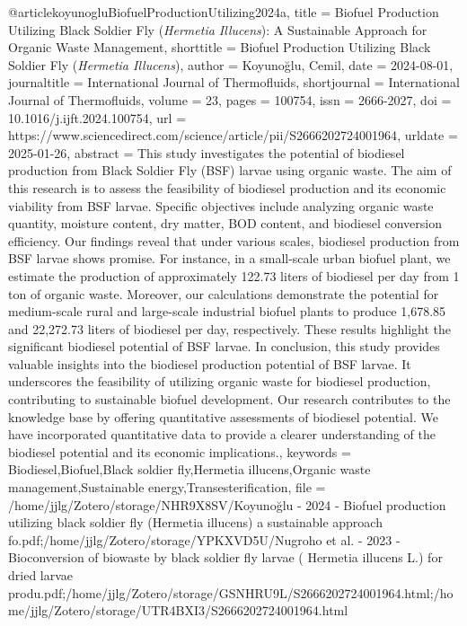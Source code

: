 {{{{@article{koyunogluBiofuelProductionUtilizing2024a,
  title = {Biofuel Production Utilizing Black Soldier Fly ({{{\mkbibemph{Hermetia}}}}{\mkbibemph{ Illucens}}): A Sustainable Approach for Organic Waste Management},
  shorttitle = {Biofuel Production Utilizing Black Soldier Fly ({{{\mkbibemph{Hermetia}}}}{\mkbibemph{ Illucens}})},
  author = {Koyunoğlu, Cemil},
  date = {2024-08-01},
  journaltitle = {International Journal of Thermofluids},
  shortjournal = {International Journal of Thermofluids},
  volume = {23},
  pages = {100754},
  issn = {2666-2027},
  doi = {10.1016/j.ijft.2024.100754},
  url = {https://www.sciencedirect.com/science/article/pii/S2666202724001964},
  urldate = {2025-01-26},
  abstract = {This study investigates the potential of biodiesel production from Black Soldier Fly (BSF) larvae using organic waste. The aim of this research is to assess the feasibility of biodiesel production and its economic viability from BSF larvae. Specific objectives include analyzing organic waste quantity, moisture content, dry matter, BOD content, and biodiesel conversion efficiency. Our findings reveal that under various scales, biodiesel production from BSF larvae shows promise. For instance, in a small-scale urban biofuel plant, we estimate the production of approximately 122.73 liters of biodiesel per day from 1 ton of organic waste. Moreover, our calculations demonstrate the potential for medium-scale rural and large-scale industrial biofuel plants to produce 1,678.85 and 22,272.73 liters of biodiesel per day, respectively. These results highlight the significant biodiesel potential of BSF larvae. In conclusion, this study provides valuable insights into the biodiesel production potential of BSF larvae. It underscores the feasibility of utilizing organic waste for biodiesel production, contributing to sustainable biofuel development. Our research contributes to the knowledge base by offering quantitative assessments of biodiesel potential. We have incorporated quantitative data to provide a clearer understanding of the biodiesel potential and its economic implications.},
  keywords = {Biodiesel,Biofuel,Black soldier fly,Hermetia illucens,Organic waste management,Sustainable energy,Transesterification},
  file = {/home/jjlg/Zotero/storage/NHR9X8SV/Koyunoğlu - 2024 - Biofuel production utilizing black soldier fly (Hermetia illucens) a sustainable approach fo.pdf;/home/jjlg/Zotero/storage/YPKXVD5U/Nugroho et al. - 2023 - Bioconversion of biowaste by black soldier fly larvae ( Hermetia illucens L.) for dried larvae produ.pdf;/home/jjlg/Zotero/storage/GSNHRU9L/S2666202724001964.html;/home/jjlg/Zotero/storage/UTR4BXI3/S2666202724001964.html}
}

}}}}
